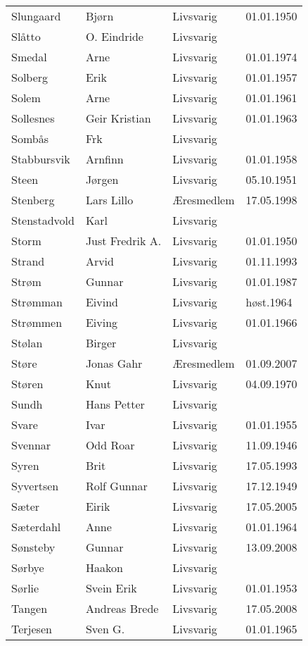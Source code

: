 \begin{longtable}{llll}
Slungaard	&	Bjørn	&	Livsvarig 	&	01.01.1950	\\
Slåtto	&	O. Eindride	&	Livsvarig 	&		\\
Smedal	&	Arne	&	Livsvarig 	&	01.01.1974	\\
Solberg	&	Erik	&	Livsvarig 	&	01.01.1957	\\
Solem	&	Arne	&	Livsvarig 	&	01.01.1961	\\
Sollesnes	&	Geir Kristian	&	Livsvarig 	&	01.01.1963	\\
Sombås	&	Frk	&	Livsvarig 	&		\\
Stabbursvik	&	Arnfinn	&	Livsvarig 	&	01.01.1958	\\
Steen	&	Jørgen	&	Livsvarig 	&	05.10.1951	\\
Stenberg 	&	Lars Lillo 	&	Æresmedlem	&	17.05.1998	\\
Stenstadvold	&	Karl	&	Livsvarig 	&		\\
Storm	&	Just Fredrik A.	&	Livsvarig 	&	01.01.1950	\\
Strand	&	Arvid	&	Livsvarig 	&	01.11.1993	\\
Strøm	&	Gunnar	&	Livsvarig 	&	01.01.1987	\\
Strømman	&	Eivind	&	Livsvarig 	&	høst.1964	\\
Strømmen	&	Eiving	&	Livsvarig 	&	01.01.1966	\\
Stølan	&	Birger	&	Livsvarig 	&		\\
Støre	&	Jonas Gahr	&	Æresmedlem	&	01.09.2007	\\
Støren	&	Knut	&	Livsvarig 	&	04.09.1970	\\
Sundh	&	Hans Petter	&	Livsvarig 	&		\\
Svare	&	Ivar	&	Livsvarig 	&	01.01.1955	\\
Svennar	&	Odd Roar	&	Livsvarig 	&	11.09.1946	\\
Syren	&	Brit	&	Livsvarig 	&	17.05.1993	\\
Syvertsen	&	Rolf Gunnar	&	Livsvarig 	&	17.12.1949	\\
Sæter 	&	Eirik	&	Livsvarig	&	17.05.2005	\\
Sæterdahl	&	Anne	&	Livsvarig 	&	01.01.1964	\\
Sønsteby	&	Gunnar	&	Livsvarig	&	13.09.2008	\\
Sørbye	&	Haakon	&	Livsvarig 	&		\\
Sørlie	&	Svein Erik	&	Livsvarig 	&	01.01.1953	\\
Tangen	&	Andreas Brede	&	Livsvarig	&	17.05.2008	\\
Terjesen	&	Sven G.	&	Livsvarig 	&	01.01.1965	\\

\end{longtable}
